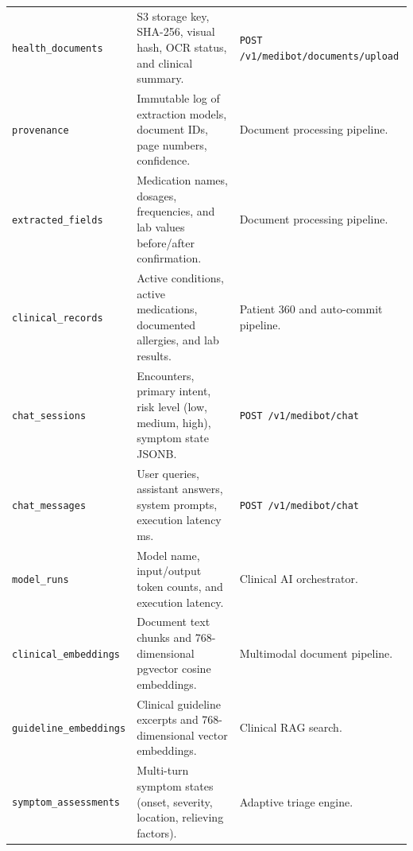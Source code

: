 \documentclass[11pt,a4paper]{article}
\begin{document}
\begin{longtable}{p{4cm} p{5.5cm} p{4.5cm}}
\texttt{health\_documents} & S3 storage key, SHA-256, visual hash, OCR status, and clinical summary. & \texttt{POST /v1/medibot/documents/upload} \\
\texttt{provenance} & Immutable log of extraction models, document IDs, page numbers, confidence. & Document processing pipeline. \\
\texttt{extracted\_fields} & Medication names, dosages, frequencies, and lab values before/after confirmation. & Document processing pipeline. \\
\texttt{clinical\_records} & Active conditions, active medications, documented allergies, and lab results. & Patient 360 and auto-commit pipeline. \\
\texttt{chat\_sessions} & Encounters, primary intent, risk level (low, medium, high), symptom state JSONB. & \texttt{POST /v1/medibot/chat} \\
\texttt{chat\_messages} & User queries, assistant answers, system prompts, execution latency ms. & \texttt{POST /v1/medibot/chat} \\
\texttt{model\_runs} & Model name, input/output token counts, and execution latency. & Clinical AI orchestrator. \\
\texttt{clinical\_embeddings} & Document text chunks and 768-dimensional pgvector cosine embeddings. & Multimodal document pipeline. \\
\texttt{guideline\_embeddings} & Clinical guideline excerpts and 768-dimensional vector embeddings. & Clinical RAG search. \\
\texttt{symptom\_assessments} & Multi-turn symptom states (onset, severity, location, relieving factors). & Adaptive triage engine. \\
\bottomrule
\end{longtable}
\end{document}
